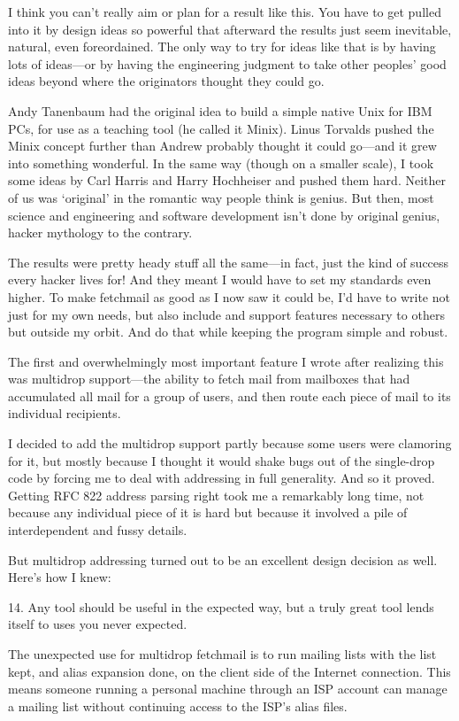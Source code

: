 \documentclass[a4paper,12pt,UTF8,twoside]{ctexbook}
\begin{document}
I think you can't really aim or plan for a result like this. You have to get pulled into it by design ideas so powerful that afterward the results just seem inevitable, natural, even foreordained. The only way to try for ideas like that is by having lots of ideas—or by having the engineering judgment to take other peoples' good ideas beyond where the originators thought they could go.

Andy Tanenbaum had the original idea to build a simple native Unix for IBM PCs, for use as a teaching tool (he called it Minix). Linus Torvalds pushed the Minix concept further than Andrew probably thought it could go—and it grew into something wonderful. In the same way (though on a smaller scale), I took some ideas by Carl Harris and Harry Hochheiser and pushed them hard. Neither of us was `original' in the romantic way people think is genius. But then, most science and engineering and software development isn't done by original genius, hacker mythology to the contrary.

The results were pretty heady stuff all the same—in fact, just the kind of success every hacker lives for! And they meant I would have to set my standards even higher. To make fetchmail as good as I now saw it could be, I'd have to write not just for my own needs, but also include and support features necessary to others but outside my orbit. And do that while keeping the program simple and robust.

The first and overwhelmingly most important feature I wrote after realizing this was multidrop support—the ability to fetch mail from mailboxes that had accumulated all mail for a group of users, and then route each piece of mail to its individual recipients.

I decided to add the multidrop support partly because some users were clamoring for it, but mostly because I thought it would shake bugs out of the single-drop code by forcing me to deal with addressing in full generality. And so it proved. Getting RFC 822 address parsing right took me a remarkably long time, not because any individual piece of it is hard but because it involved a pile of interdependent and fussy details.

But multidrop addressing turned out to be an excellent design decision as well. Here's how I knew:

14. Any tool should be useful in the expected way, but a truly great tool lends itself to uses you never expected.

The unexpected use for multidrop fetchmail is to run mailing lists with the list kept, and alias expansion done, on the client side of the Internet connection. This means someone running a personal machine through an ISP account can manage a mailing list without continuing access to the ISP's alias files.
\end{document}
